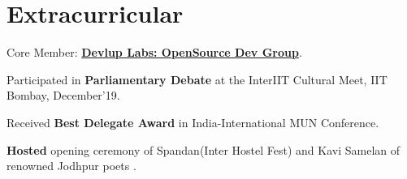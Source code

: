 \documentclass{deedy-resume-openfont}
\begin{document}
\begin{minipage}[t]{0.66\textwidth}
\section{Extracurricular} 
\begin{tightemize}
{\justifying
\item Core Member: \href{https://github.com/devlup-labs}{\bf \textbf{Devlup Labs}: OpenSource Dev Group}.
\item Participated in \textbf{Parliamentary Debate} at the InterIIT Cultural Meet, IIT Bombay, December'19.
\item Received\textbf{ Best Delegate Award} in India-International MUN Conference.
\item \textbf{Hosted} opening ceremony of Spandan(Inter Hostel Fest) and Kavi Samelan of renowned Jodhpur poets .

\par}
\end{tightemize}
\sectionsep

\end{minipage} 
\end{document}

